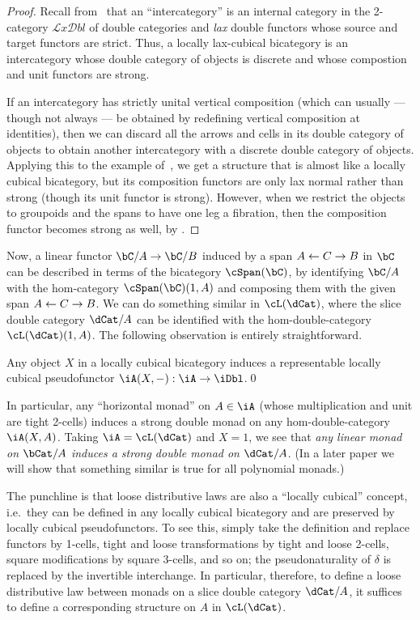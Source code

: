 \documentclass{amsart}
\newcommand{\dl}{\delta}
\def\lxdbl{\ensuremath{\mathcal{L}\mathit{x}\mathcal{D}\mathit{bl}}\xspace}
\begin{document}
\begin{proof}
  Recall from~\cite{gp:intercategories-i,gp:intercategories-ii} that an ``intercategory'' is an internal category in the 2-category \lxdbl of double categories and \emph{lax} double functors whose source and target functors are strict.
  Thus, a locally lax-cubical bicategory is an intercategory whose double category of objects is discrete and whose compostion and unit functors are strong.

  If an intercategory has strictly unital vertical composition (which can usually --- though not always --- be obtained by redefining vertical composition at identities), then we can discard all the arrows and cells in its double category of objects to obtain another intercategory with a discrete double category of objects.
  Applying this to the example of~\cite[6.5]{gp:intercategories-ii}, we get a structure that is almost like a locally cubical bicategory, but its composition functors are only lax normal rather than strong (though its unit functor is strong).
  However, when we restrict the objects to groupoids and the spans to have one leg a fibration, then the composition functor becomes strong as well, by \cite[Proposition 49]{garner:double-clubs}.
\end{proof}

Now, a linear functor $\bC/A\to \bC/B$ induced by a span $A \leftarrow C \to B$ in $\bC$ can be described in terms of the bicategory $\cSpan(\bC)$, by identifying $\bC/A$ with the hom-category $\cSpan(\bC)(1,A)$ and composing them with the given span $A \leftarrow C \to B$.
We can do something similar in $\cL(\dCat)$, where the slice double category $\dCat/A$ can be identified with the hom-double-category $\cL(\dCat)(1,A)$.
The following observation is entirely straightforward.

\begin{thm}
  Any object $X$ in a locally cubical bicategory \iA induces a representable locally cubical pseudofunctor $\iA(X,-):\iA \to \iDbl$.\qed
\end{thm}

In particular, any ``horizontal monad'' on $A\in \iA$ (whose multiplication and unit are tight 2-cells) induces a strong double monad on any hom-double-category $\iA(X,A)$.
Taking $\iA=\cL(\dCat)$ and $X=1$, we see that \emph{any linear monad on $\bCat/A$ induces a strong double monad on $\dCat/A$}.
(In a later paper we will show that something similar is true for all polynomial monads.)

The punchline is that loose distributive laws are also a ``locally cubical'' concept, i.e.\ they can be defined in any locally cubical bicategory and are preserved by locally cubical pseudofunctors.
To see this, simply take the definition and replace functors by 1-cells, tight and loose transformations by tight and loose 2-cells, square modifications by square 3-cells, and so on; the pseudonaturality of $\dl$ is replaced by the invertible interchange.
In particular, therefore, to define a loose distributive law between monads on a slice double category $\dCat/A$, it suffices to define a corresponding structure on $A$ in $\cL(\dCat)$.
\end{document}
